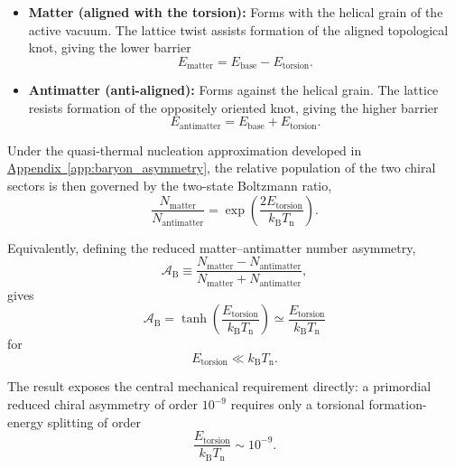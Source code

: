 \begin{itemize}
    \item \textbf{Matter (aligned with the torsion):} Forms with the helical grain of the active vacuum. The lattice twist assists formation of the aligned topological knot, giving the lower barrier
    \begin{equation}
        E_{\mathrm{matter}} = E_{\mathrm{base}} - E_{\mathrm{torsion}}.
    \end{equation}

    \item \textbf{Antimatter (anti-aligned):} Forms against the helical grain. The lattice resists formation of the oppositely oriented knot, giving the higher barrier
    \begin{equation}
        E_{\mathrm{antimatter}} = E_{\mathrm{base}} + E_{\mathrm{torsion}}.
    \end{equation}
\end{itemize}

Under the quasi-thermal nucleation approximation developed in \hyperref[app:baryon_asymmetry]{Appendix~\ref*{app:baryon_asymmetry}}, the relative population of the two chiral sectors is then governed by the two-state Boltzmann ratio,
\begin{equation}
    \frac{N_{\mathrm{matter}}}{N_{\mathrm{antimatter}}} = \exp\left( \frac{2E_{\mathrm{torsion}}}{k_{\mathrm B}T_{\mathrm n}} \right).
\end{equation}

Equivalently, defining the reduced matter--antimatter number asymmetry,
\begin{equation}
    \mathcal A_{\mathrm B} \equiv \frac{N_{\mathrm{matter}} - N_{\mathrm{antimatter}}}{N_{\mathrm{matter}} + N_{\mathrm{antimatter}}},
\end{equation}
gives
\begin{equation}
    \mathcal A_{\mathrm B} = \tanh\left( \frac{E_{\mathrm{torsion}}}{k_{\mathrm B}T_{\mathrm n}} \right) \simeq \frac{E_{\mathrm{torsion}}}{k_{\mathrm B}T_{\mathrm n}}
\end{equation}
for
\begin{equation}
    E_{\mathrm{torsion}} \ll k_{\mathrm B}T_{\mathrm n}.
\end{equation}

The result exposes the central mechanical requirement directly: a primordial reduced chiral asymmetry of order \(10^{-9}\) requires only a torsional formation-energy splitting of order
\begin{equation}
    \frac{E_{\mathrm{torsion}}}{k_{\mathrm B}T_{\mathrm n}} \sim 10^{-9}.
\end{equation}

